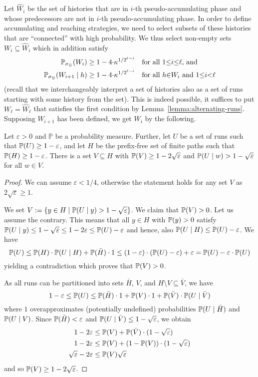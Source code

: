 \documentclass[a4paper,UKenglish]{lipics}
\renewcommand{\Pr}[3][]{\ifblank{#1}{\mathbb{P}_{#2}}{\mathbb{P}^{#1}_{#2}}(#3)}
\renewcommand{\P}[2][]{\ifblank{#1}{\mathbb{P}(#2)}{\mathbb{P}^{#1}(#2)}}
\newcommand{\eps}{\varepsilon}
\begin{document}
Let $\hat W_i$ be the set of histories that are in $i$-th pseudo-accumulating phase and whose predecessors are not in $i$-th pseudo-accumulating phase.
In order to define accumulating and reaching strategies, we need to select subsets of these histories that are ``connected'' with high probability.
We thus select non-empty sets $W_i\subseteq \hat W_i$ which in addition satisfy 
\begin{align*}
\Pr{\sigma_\otimes}{W_{i}} \ge 1-4 {\cdot} \kappa^{1/2^{\ell - i}} & \quad  \text{for all $1{\le} i{\le} \ell$, and } \\
\Pr{\sigma_\otimes}{W_{i+1}\mid h} \ge 1-4 {\cdot} \kappa^{1/2^{\ell - i}} & \quad \text{for all $h{\in}W_i$ and $1{\le} i {<} \ell$}
\end{align*}
(recall that we interchangeably interpret a set of histories also as a set of runs starting with some history from the set).
This is indeed possible, it suffices to put $W_{\ell} = \hat W_{\ell}$ that satisfies the first condition by Lemma~\ref{lemma:alternating-runs}. Supposing $W_{i+1}$ has been defined, we get $W_i$ by the following.

\begin{lemma}\label{lemma:future-prob}
Let $\eps > 0$ and $\mathbb{P}$ be a probability measure. Further, let $U$ be a set of runs such that $\P{U} \ge 1-\varepsilon$, and let $H$ be the prefix-free set of finite paths such that $\P{H} \ge 1-\varepsilon$. There is a set $V\subseteq H$ with $\P{V} \ge 1 - 2\sqrt\eps$
	and $\P{U \mid w} > 1-\sqrt\eps$ for all $w\in V$.
\end{lemma}
\begin{proof}
	We can assume $\eps < 1/4$, otherwise the statement holds for any set $V$ as $2\sqrt{\eps} \geq 1$.
	
	We set $V := \{y\in H\mid \P{U\mid y} > 1-\sqrt\varepsilon\}$. We claim that $\P{V} > 0$. Let us assume the contrary. This means that all $y \in H$ with $\P{y} > 0$ satisfy $\P{U\mid y} \leq 1 - \sqrt{\eps} \leq 1- 2\eps \leq \P{U} - \eps$ and hence, also $\P{U \mid H} \leq \P{U} - \eps$. We have 
	$$\P{U} \leq \P{H} \cdot \P{U \mid H} + \P{\bar H} \cdot 1 \leq (1-\eps)\cdot (\P{U} - \eps) + \eps = \P{U} - \eps \cdot \P{U}$$
	yielding a contradiction which proves that $\P{V} > 0$.



	As all runs can be partitioned into sets $\bar H$, $V$, and $H\setminus V \subseteq \bar V$, we have
	\[
	1-\varepsilon \le \P{U} \leq \P{\bar H} \cdot 1 + \P{V}\cdot 1 + \P{\bar V} \cdot \P{U\mid \bar{V}}
	\]
	where $1$ overapproximates (potentially undefined) probabilities $\P{U \mid \bar H}$ and $\P{U\mid V}$.
	Since $\P{\bar H} < \eps$ and $\P{U\mid \bar V} \leq 1-\sqrt\eps$, we obtain
	\begin{align*}
	1- 2\varepsilon &\le \P{V} + \P{\bar V} \cdot (1-\sqrt\eps) \\
	1- 2\varepsilon &\le \P{V} + (1 - \P{V}) \cdot (1-\sqrt\eps) \\
	\sqrt\eps -2\eps &\le \P{V} \sqrt\eps
	\end{align*}
	and so $\P{V} \geq 1 - 2\sqrt{\eps}$.
\end{proof}
\end{document}
